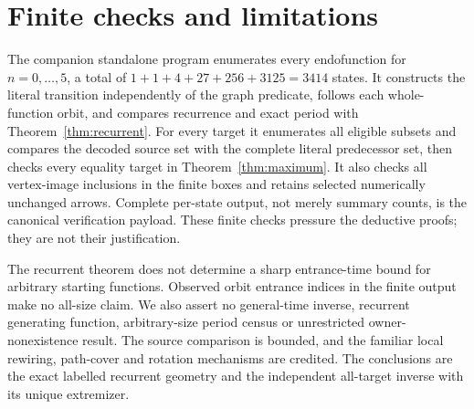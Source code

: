 \section{Finite checks and limitations}

The companion standalone program enumerates every endofunction for
$n=0,\ldots,5$, a total of $1+1+4+27+256+3125=3414$ states. It constructs
the literal transition independently of the graph predicate, follows each
whole-function orbit, and compares recurrence and exact period with
Theorem~\ref{thm:recurrent}. For every target it enumerates all eligible
subsets and compares the decoded source set with the complete literal
predecessor set, then checks every equality target in
Theorem~\ref{thm:maximum}. It also checks all vertex-image inclusions in
the finite boxes and retains selected numerically unchanged arrows.
Complete per-state output, not merely summary counts, is the canonical
verification payload. These finite checks pressure the deductive proofs;
they are not their justification.

The recurrent theorem does not determine a sharp entrance-time bound for
arbitrary starting functions. Observed orbit entrance indices in the
finite output make no all-size claim. We also assert no general-time
inverse, recurrent generating function, arbitrary-size period census or
unrestricted owner-nonexistence result. The source comparison is bounded,
and the familiar local rewiring, path-cover and rotation mechanisms are
credited. The conclusions are the exact labelled recurrent geometry and
the independent all-target inverse with its unique extremizer.
